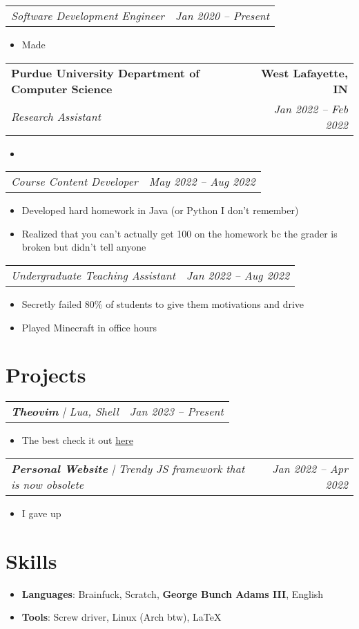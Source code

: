 \documentclass[letterpaper,11pt]{article} %
\makeatletter
\newcommand{\fourItems}[4]{
  \begin{tabular*}{1.0\textwidth}[t]{l@{\extracolsep{\fill}}r}
    \textbf{\large #1} & \textbf{\small #2} \\
    \textit{\large #3} & \textit{\small #4} \\
  \end{tabular*}

  \vspace*{-0.5em}
}
\newcommand{\twoItems}[2]{
  \begin{tabular*}{1.0\textwidth}{l@{\extracolsep{\fill}}r}
    \textit{\large #1} & \textit{\small #2} \\
  \end{tabular*}

  \vspace*{-0.5em} %
}
\newenvironment{tightItemize}
  {\begin{itemize}[itemsep=-0.3em]}
  {\end{itemize}\vspace*{-0.5em}}
\makeatother
\begin{document}
\twoItems{Software Development Engineer}{Jan 2020 -- Present}
\begin{tightItemize}
  \item Made 
\end{tightItemize}

\fourItems{Purdue University Department of Computer Science}{West Lafayette, IN}
{Research Assistant}{Jan 2022 -- Feb 2022}
\begin{tightItemize}
  \item 
\end{tightItemize}

\twoItems{Course Content Developer}{May 2022 -- Aug 2022}
\begin{tightItemize}
  \item Developed hard homework in Java (or Python I don't remember)
  \item Realized that you can't actually get 100 on the homework bc the grader is broken but didn't tell anyone
\end{tightItemize}

\twoItems{Undergraduate Teaching Assistant}{Jan 2022 -- Aug 2022}
\begin{tightItemize}
  \item Secretly failed 80\% of students to give them motivations and drive
  \item Played Minecraft in office hours
\end{tightItemize}


\section{Projects}

\twoItems{\textbf{Theovim}{ | }\textit{Lua, Shell}}{Jan 2023 -- Present}
\begin{tightItemize}
  \item The best check it out \href{https://github.com/theopn/theovim}{here}
\end{tightItemize}

\twoItems{\textbf{Personal Website}{ | }\textit{Trendy JS framework that is now obsolete}}{Jan 2022 -- Apr 2022}
\begin{tightItemize}
  \item I gave up
\end{tightItemize}


\section{Skills}

\begin{itemize}[itemsep=-0.3em, leftmargin=5pt, label={}]
  \item \textbf{\large Languages}: Brainfuck, Scratch, \textbf{\large George Bunch Adams III}, English
  \item \textbf{\large Tools}: Screw driver, Linux (Arch btw), \LaTeX
\end{itemize}
\end{document}
